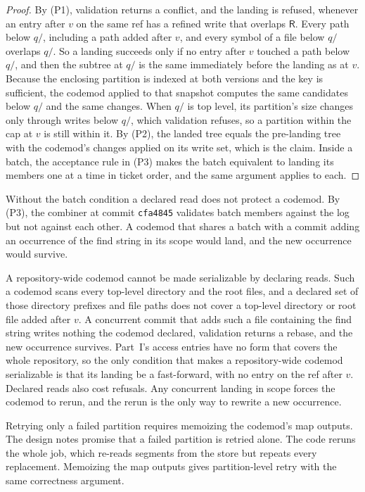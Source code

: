 \documentclass[11pt,letterpaper]{article}
\theoremstyle{definition}
\theoremstyle{remark}
\newcommand{\R}{\mathsf{R}}
\DeclareRobustCommand{\code}[1]{{\def\_{\textunderscore\allowbreak}\texttt{#1}}}
\begin{document}
\begin{proof}
By (P1), validation returns a conflict, and the landing is refused, whenever an entry after $v$ on the same ref has a refined write that overlaps $\R$. Every path below $q/$, including a path added after $v$, and every symbol of a file below $q/$ overlaps $q/$. So a landing succeeds only if no entry after $v$ touched a path below $q/$, and then the subtree at $q/$ is the same immediately before the landing as at $v$. Because the enclosing partition is indexed at both versions and the key is sufficient, the codemod applied to that snapshot computes the same candidates below $q/$ and the same changes. When $q/$ is top level, its partition's size changes only through writes below $q/$, which validation refuses, so a partition within the cap at $v$ is still within it. By (P2), the landed tree equals the pre-landing tree with the codemod's changes applied on its write set, which is the claim. Inside a batch, the acceptance rule in (P3) makes the batch equivalent to landing its members one at a time in ticket order, and the same argument applies to each.
\end{proof}

Without the batch condition a declared read does not protect a codemod. By (P3), the combiner at commit \code{cfa4845} validates batch members against the log but not against each other. A codemod that shares a batch with a commit adding an occurrence of the find string in its scope would land, and the new occurrence would survive.

A repository-wide codemod cannot be made serializable by declaring reads. Such a codemod scans every top-level directory and the root files, and a declared set of those directory prefixes and file paths does not cover a top-level directory or root file added after $v$. A concurrent commit that adds such a file containing the find string writes nothing the codemod declared, validation returns a rebase, and the new occurrence survives. Part~I's access entries have no form that covers the whole repository, so the only condition that makes a repository-wide codemod serializable is that its landing be a fast-forward, with no entry on the ref after $v$. Declared reads also cost refusals. Any concurrent landing in scope forces the codemod to rerun, and the rerun is the only way to rewrite a new occurrence.

Retrying only a failed partition requires memoizing the codemod's map outputs. The design notes promise that a failed partition is retried alone. The code reruns the whole job, which re-reads segments from the store but repeats every replacement. Memoizing the map outputs gives partition-level retry with the same correctness argument.
\end{document}

